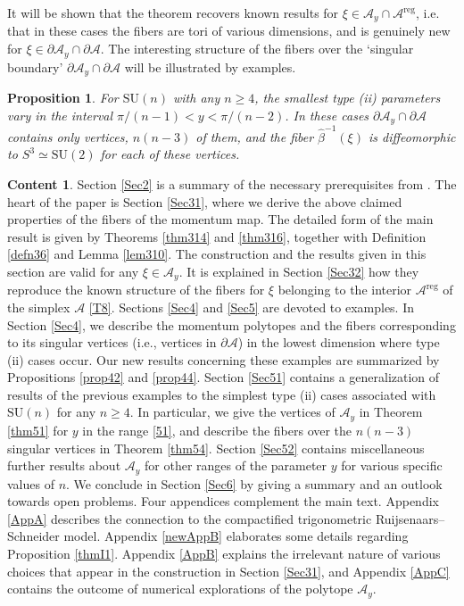 \documentclass[a4paper,11pt,reqno]{amsart}
\newtheorem{prop}[thm]{Proposition}
\theoremstyle{definition}
\newtheorem*{conte*}{Content}
\numberwithin{equation}{section}
\def\cA{{\mathcal A}}                       %
\def\reg{\mathrm{reg}}                      %
\def\SU{\mathrm{SU}}                        %
\def\reg{\mathrm{reg}}                      %
\begin{document}
It will be shown that the theorem recovers known results for $\xi \in \cA_y \cap \cA^\reg$, i.e. that in these  cases
the fibers are tori of various dimensions,
and is genuinely new for $\xi \in
\partial \cA_y \cap \partial \cA$. The interesting structure of the fibers over the `singular boundary'
 $\partial \cA_y \cap \partial \cA$ will
be illustrated by examples.

\begin{prop}\label{propmain}
For $\SU(n)$ with any $n\geq 4$,  the smallest type (ii) parameters vary in the interval $ \pi/(n-1) <y < \pi/(n-2)$.
In these cases  $\partial \cA_y \cap \partial \cA$ contains only vertices, $n (n-3)$ of them, and
 the fiber $\hat \beta^{-1}(\xi)$ is diffeomorphic to $S^3 \simeq \SU(2)$ for each of these vertices.
\end{prop}



\begin{conte*}
Section \ref{Sec2} is a summary of the necessary  prerequisites from \cite{FK}.
The heart of the paper is Section \ref{Sec31}, where we derive the above claimed properties of the fibers of the
momentum map.  The detailed form of the main result is given by Theorems \ref{thm314} and \ref{thm316}, together
with Definition \ref{defn36} and Lemma \ref{lem310}.
The construction and the results given in this section are valid for any $\xi \in \cA_y$.
It is explained in Section \ref{Sec32} how they reproduce the known structure of the fibers for $\xi$
belonging to the interior $\cA^\reg$  of the simplex $\cA$ \eqref{T8}.
Sections \ref{Sec4} and \ref{Sec5} are devoted to examples.
In Section \ref{Sec4}, we describe the momentum polytopes and the fibers corresponding to its singular vertices
(i.e., vertices in $\partial \cA$)
in the lowest dimension where type (ii) cases occur. Our new results concerning these examples are summarized by
Propositions \ref{prop42} and \ref{prop44}.
 Section \ref{Sec51} contains a generalization of results of the previous examples to the simplest type (ii) cases
 associated with $\SU(n)$ for any $n\geq 4$. In particular, we give the vertices of $\cA_y$ in Theorem \ref{thm51}
 for $y$ in the range \eqref{51}, and  describe the fibers over the $n(n-3)$ singular vertices in Theorem \ref{thm54}.
 Section \ref{Sec52}  contains miscellaneous further results about $\cA_y$ for other ranges of the parameter $y$ for various specific values of $n$.
 We conclude in Section \ref{Sec6} by giving a summary and an outlook towards open problems.
 Four appendices complement the main text.
 Appendix \ref{AppA} describes the connection to the compactified trigonometric Ruijsenaars--Schneider model.
  Appendix \ref{newAppB} elaborates some details regarding Proposition \ref{thmI1}.
 Appendix \ref{AppB} explains the irrelevant nature of various choices that appear in the construction in Section \ref{Sec31},
 and Appendix \ref{AppC} contains the outcome of numerical
 explorations of the polytope $\cA_y$. %
\end{conte*}
\end{document}
